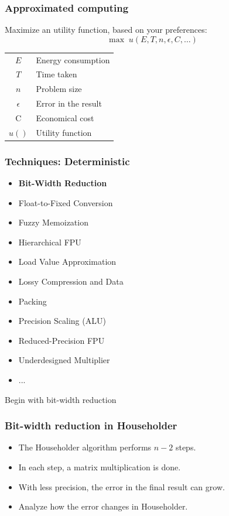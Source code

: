 \documentclass[serif, 12pt]{beamer}
\begin{document}

\begin{frame}
%
\frametitle{Approximated computing}
%
Maximize an utility function, based on your preferences:
$$ \max \; u(E, T, n, \epsilon, C, \ldots) $$

\begin{center}
\begin{tabular}{c l}
	$E$ & Energy consumption \\
	$T$ & Time taken\\
	$n$ & Problem size \\
	$\epsilon$ & Error in the result \\
	C &  Economical cost \\
	$u()$ & Utility function \\
\end{tabular}
\end{center}

\end{frame}


\begin{frame}
%
\frametitle{Techniques: Deterministic}
%
\begin{itemize}
\item \textbf{Bit-Width Reduction}
\item Float-to-Fixed Conversion
\item Fuzzy Memoization
\item Hierarchical FPU
\item Load Value Approximation
\item Lossy Compression and Data
\item Packing
\item Precision Scaling (ALU)
\item Reduced-Precision FPU
\item Underdesigned Multiplier
\item ...
\end{itemize}

\pause

Begin with bit-width reduction
\end{frame}


\begin{frame}
%
\frametitle{Bit-width reduction in Householder}
%
\begin{itemize}
\item The Householder algorithm performs $n-2$ steps.
\item In each step, a matrix multiplication is done.
\item With less precision, the error in the final result can grow.
\item Analyze how the error changes in Householder.
\end{itemize}

\end{frame}
\end{document}
